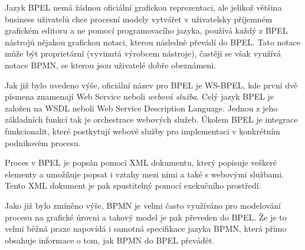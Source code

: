 \documentclass[]{article}
\begin{document}
Jazyk BPEL nemá žádnou oficiální grafickou reprezentaci, ale jelikož většina business uživatelů chce procesní modely vytvářet v uživatelsky příjemném grafickém editoru a ne pomocí programovacího jazyka, používá každý z BPEL nástrojů nějakou grafickou notaci, kterou následně převádí do BPEL. Tato notace může být proprietární (vyvinutá výrobcem nástroje), častěji se však využívá notace BPMN, se kterou jsou uživatelé dobře obeznámeni.

Jak již bylo uvedeno výše, oficiální název pro BPEL je WS-BPEL, kde první dvě písmena znamenají Web Service neboli \textit{webová služba}. Celý jazyk BPEL je založen na WSDL neboli Web Service Description Language. Jednou z jeho základních funkcí tak je orchestrace webových služeb. Úkolem BPEL je integrace funkcionalit, které postkytují webové služby pro implementaci v konkrétním podnikovém procesu.

Proces v BPEL je popsán pomocí XML dokumentu, který popisuje veškeré elementy a umožňuje popsat i vztahy mezi nimi a také s webovými službami. Tento XML dokument je pak spustitelný pomocí exekučního prostředí.

Jako již bylo zmíněno výše, BPMN je velmi často využíváno pro modelování procesu na grafické úrovni a takový model je pak převeden do BPEL. Že je to velmi běžná praxe napovídá i samotná specifikace jazyka BPMN, která přímo obsahuje informace o tom, jak BPMN do BPEL převádět. \cite{Cerny2010}


\nocite{*}


\end{document}
